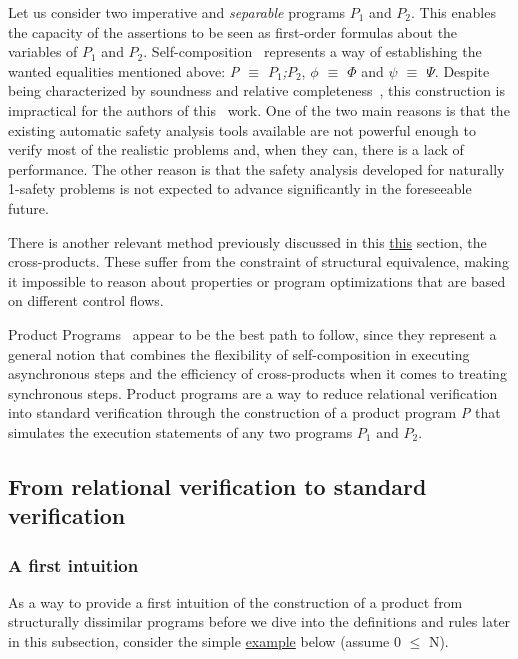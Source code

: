 Let us consider two imperative and \emph{separable} programs \emph{$P_1$} and \emph{$P_2$}.
This enables the capacity of the assertions to be seen as first-order formulas about the variables of \emph{$P_1$} and \emph{$P_2$}.
Self-composition~\cite{DBLP:conf/csfw/BartheDR04} represents a way of establishing the wanted equalities mentioned above: \emph{P $\equiv$ $P_1$;$P_2$}, \emph{$\phi$ $\equiv$ $\Phi$} and \emph{$\psi$ $\equiv$ $\Psi$}.
Despite being characterized by soundness and relative completeness~\cite{DBLP:journals/jlp/BartheCK16}, this construction is impractical for the authors of this~\cite{DBLP:conf/sas/TerauchiA05} work.
One of the two main reasons is that the existing automatic safety analysis tools available are not powerful enough to verify most of the realistic problems and, when they can, there is a lack of performance.
The other reason is that the safety analysis developed for naturally 1-safety problems is not expected to advance significantly in the foreseeable future.

There is another relevant method previously discussed in this \hyperref[sec:cross_products]{this} section, the cross-products.
These suffer from the constraint of structural equivalence, making it impossible to reason about properties or program optimizations that are based on different control flows.

Product Programs~\cite{DBLP:conf/fm/BartheCK11} appear to be the best path to follow, since they represent a general notion that combines the flexibility of self-composition in executing asynchronous steps and the efficiency of cross-products when it comes to treating synchronous steps. 
Product programs are a way to reduce relational verification into standard verification through the construction of a product program \emph{P} that simulates the execution statements of any two programs \emph{$P_1$} and \emph{$P_2$}.


\FloatBarrier
\subsection{From relational verification to standard verification} 
\label{subsec:product_programs_relverif_to_stdverif}

\subsubsection{A first intuition} 
\label{subsubsec:product_programs_intuition}

As a way to provide a first intuition of the construction of a product from structurally dissimilar programs before we dive into the definitions and rules later in this subsection, consider the simple \hyperref[fig:pp_first_intuition]{example} below (assume 0 $\leq$ N).

